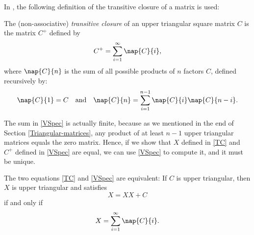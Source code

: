 In \citep{Valiant}, the following definition of the transitive closure of a matrix is used:
\begin{Definition}
  The (non-associative) \emph{transitive closure} of an upper triangular square matrix $C$ is the matrix $C^+$ defined by
  \begin{equation}\label{VSpec}
    C^+ = \sum_{i = 1}^\infty \nap{C}{i},
  \end{equation}
  where $\nap{C}{n}$ is the sum of all possible products of $n$ factors $C$, defined recursively by:
  \begin{equation*}
    \nap{C}{1} = C \quad \text{and} \quad \nap{C}{n} = \sum_{i = 1}^{n - 1}\nap{C}{i}\nap{C}{n - i}.
  \end{equation*}
\end{Definition}
The sum in \eqref{VSpec} is actually finite, because as we mentioned in the end of Section \ref{Triangular-matrices}, any product of at least $n -1$ upper triangular matrices equals the zero matrix. Hence, if we show that $X$ defined in \eqref{TC} and $C^+$ defined in \eqref{VSpec} are equal, we can use \eqref{VSpec} to compute it, and it must be unique.
 \begin{Proposition}
   The two equations \eqref{TC} and \eqref{VSpec} are equivalent: If $C$ is upper triangular, then $X$ is upper triangular and satisfies
   \begin{equation}
     X = XX + C
   \end{equation}
   if and only if
   \begin{equation}
     X = \sum_{i = 1}^\infty \nap{C}{i}.
   \end{equation}
 \end{Proposition}
